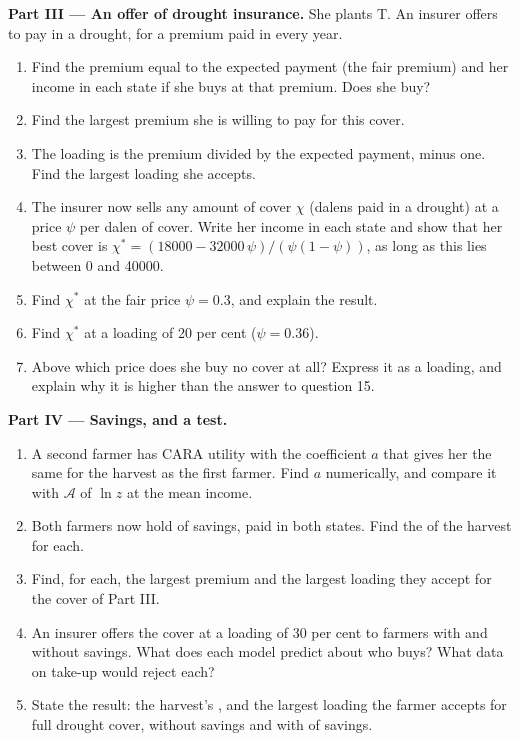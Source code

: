 \begin{problem}
\medskip
\noindent\textbf{Part III --- An offer of drought insurance.}
She plants T. An insurer offers to pay  in a drought, for a premium paid in every year.
\begin{enumerate}[resume]
  \item Find the premium equal to the expected payment (the fair premium) and her income in each state
        if she buys at that premium. Does she buy?
  \item Find the largest premium she is willing to pay for this cover.
  \item The loading is the premium divided by the expected payment, minus one. Find the largest loading
        she accepts.
  \item The insurer now sells any amount of cover $\chi$ (dalens paid in a drought) at a price $\psi$ per
        dalen of cover. Write her income in each state and show that her best cover is $\chi^{*} =
        (\num{18000} - \num{32000}\,\psi)/(\psi (1-\psi))$, as long as this lies between $0$ and \num{40000}.
  \item Find $\chi^{*}$ at the fair price $\psi  = 0.3$, and explain the result.
  \item Find $\chi^{*}$ at a loading of 20 per cent ($\psi  = 0.36$).
  \item Above which price does she buy no cover at all? Express it as a loading, and explain why it is
        higher than the answer to question 15.
\end{enumerate}

\medskip
\noindent\textbf{Part IV --- Savings, and a test.}
\begin{enumerate}[resume]
  \item A second farmer has CARA utility with the coefficient $a$ that gives her the same 
        for the harvest as the first farmer. Find $a$ numerically, and compare it with $\mathcal{A}$ of
        $\ln z$ at the mean income.
  \item Both farmers now hold  of savings, paid in both states. Find the  of the
        harvest for each.
  \item Find, for each, the largest premium and the largest loading they accept for the cover of Part
        III.
  \item An insurer offers the cover at a loading of 30 per cent to farmers with and without savings.
        What does each model predict about who buys? What data on take-up would reject each?
  \item State the result: the harvest's , and the largest loading the farmer accepts for
        full drought cover, without savings and with  of savings.
\end{enumerate}
\end{problem}
